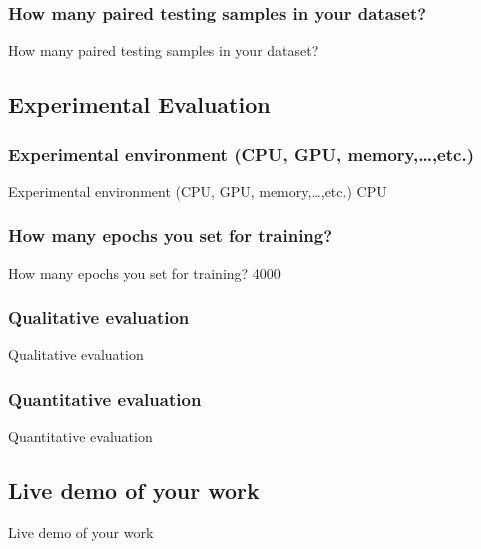 \documentclass{beamer}
\begin{document}
\subsubsection{How many paired testing samples in your dataset?}
\begin{frame}{How many paired testing samples in your dataset?}

\end{frame}

\subsection{Experimental Evaluation }
\subsubsection{Experimental environment (CPU, GPU, memory,…,etc.)}
\begin{frame}{Experimental environment (CPU, GPU, memory,…,etc.)}
CPU
\end{frame}

\subsubsection{How many epochs you set for training?}
\begin{frame}{How many epochs you set for training?}
4000
\end{frame}

\subsubsection{Qualitative evaluation}
\begin{frame}{Qualitative evaluation}

\end{frame}

\subsubsection{Quantitative evaluation}
\begin{frame}{Quantitative evaluation}

\end{frame}

\subsection{Live demo of your work}
\begin{frame}{Live demo of your work}

\end{frame}
\end{document}

